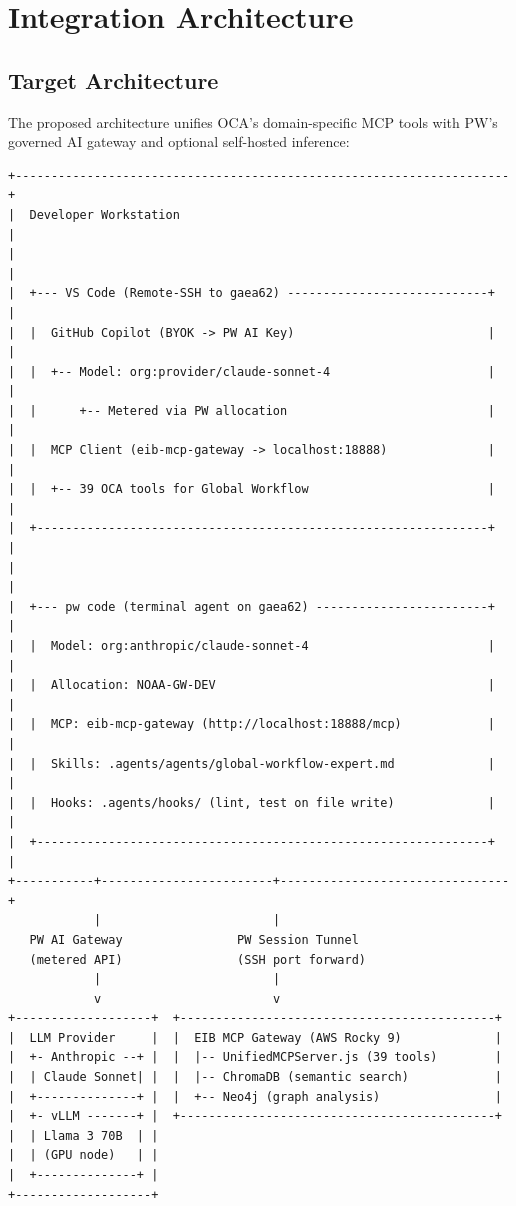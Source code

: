 \documentclass[11pt,letterpaper,twoside]{article}
\begin{document}
\section{Integration Architecture}
\label{sec:integration}

\subsection{Target Architecture}

The proposed architecture unifies OCA's domain-specific MCP tools with PW's
governed AI gateway and optional self-hosted inference:

\begin{lstlisting}[style=diagram]
+---------------------------------------------------------------------+
|  Developer Workstation                                              |
|                                                                     |
|  +--- VS Code (Remote-SSH to gaea62) ----------------------------+  |
|  |  GitHub Copilot (BYOK -> PW AI Key)                           |  |
|  |  +-- Model: org:provider/claude-sonnet-4                      |  |
|  |      +-- Metered via PW allocation                            |  |
|  |  MCP Client (eib-mcp-gateway -> localhost:18888)              |  |
|  |  +-- 39 OCA tools for Global Workflow                         |  |
|  +---------------------------------------------------------------+  |
|                                                                     |
|  +--- pw code (terminal agent on gaea62) ------------------------+  |
|  |  Model: org:anthropic/claude-sonnet-4                         |  |
|  |  Allocation: NOAA-GW-DEV                                      |  |
|  |  MCP: eib-mcp-gateway (http://localhost:18888/mcp)            |  |
|  |  Skills: .agents/agents/global-workflow-expert.md             |  |
|  |  Hooks: .agents/hooks/ (lint, test on file write)             |  |
|  +---------------------------------------------------------------+  |
+-----------+------------------------+--------------------------------+
            |                        |
   PW AI Gateway                PW Session Tunnel
   (metered API)                (SSH port forward)
            |                        |
            v                        v
+-------------------+  +--------------------------------------------+
|  LLM Provider     |  |  EIB MCP Gateway (AWS Rocky 9)             |
|  +- Anthropic --+ |  |  |-- UnifiedMCPServer.js (39 tools)        |
|  | Claude Sonnet| |  |  |-- ChromaDB (semantic search)            |
|  +--------------+ |  |  +-- Neo4j (graph analysis)                |
|  +- vLLM -------+ |  +--------------------------------------------+
|  | Llama 3 70B  | |
|  | (GPU node)   | |
|  +--------------+ |
+-------------------+
\end{lstlisting}
\end{document}
